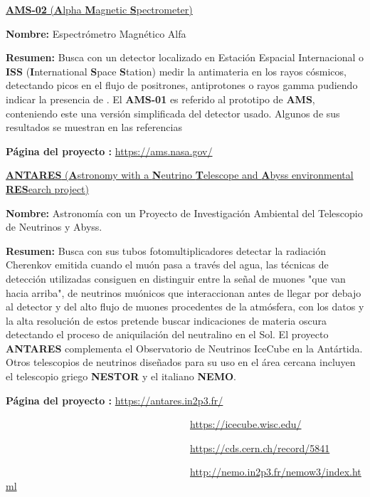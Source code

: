 \href{https://en.wikipedia.org/wiki/Alpha_Magnetic_Spectrometer}{\textbf{AMS-02} (\textbf{A}lpha \textbf{M}agnetic \textbf{S}pectrometer)}
\begin{itemize_f}\label{AMS}
\item \textbf{Nombre:} Espectrómetro Magnético Alfa
\item \textbf{Resumen:} Busca con un detector localizado en Estación Espacial Internacional o \textbf{ISS} (\textbf{I}nternational \textbf{S}pace \textbf{S}tation) medir la antimateria en los rayos cósmicos, detectando picos en el flujo de positrones, antiprotones o rayos gamma pudiendo indicar la presencia de \neutralinos. El \textbf{AMS-01} es referido al prototipo de \textbf{AMS}, conteniendo este una versión simplificada del detector usado. Algunos de sus resultados se muestran en las referencias \cite{li_antiproton_2017,battiston_anti_2008}
\item \textbf{Página del proyecto :} \href{https://ams.nasa.gov/}{https://ams.nasa.gov/}
\end{itemize_f}

\href{https://en.wikipedia.org/wiki/ANTARES_(telescope)}{\textbf{ANTARES} (\textbf{A}stronomy with a \textbf{N}eutrino \textbf{T}elescope and \textbf{A}byss environmental \textbf{RES}earch project)}
\begin{itemize_f}\label{antares}
\item \textbf{Nombre:} Astronomía con un Proyecto de Investigación Ambiental del Telescopio de Neutrinos y Abyss.
\item \textbf{Resumen:} Busca con sus tubos fotomultiplicadores detectar la radiación Cherenkov emitida cuando el muón pasa a través del agua, las técnicas de detección utilizadas consiguen en distinguir entre la señal de muones "que van hacia arriba", de neutrinos muónicos que interaccionan antes de llegar por debajo al detector y del alto flujo de muones procedentes de la atmósfera, con los datos y la alta resolución de estos pretende buscar indicaciones de materia oscura detectando el proceso de aniquilación del neutralino en el Sol. El proyecto \textbf{ANTARES} complementa el Observatorio de Neutrinos IceCube en la Antártida. Otros telescopios de neutrinos diseñados para su uso en el área cercana incluyen el telescopio griego \textbf{NESTOR} y el italiano \textbf{NEMO}. 

\item \textbf{Página del proyecto :} \href{https://antares.in2p3.fr/}{https://antares.in2p3.fr/}

~~~~~~~~~~~~~~~~~~~~~~~~~~~~~~~~~~~~~\href{https://icecube.wisc.edu/}{https://icecube.wisc.edu/}

~~~~~~~~~~~~~~~~~~~~~~~~~~~~~~~~~~~~~\href{https://cds.cern.ch/record/5841}{https://cds.cern.ch/record/5841}

~~~~~~~~~~~~~~~~~~~~~~~~~~~~~~~~~~~~~\href{http://nemo.in2p3.fr/nemow3/index.html}{http://nemo.in2p3.fr/nemow3/index.html}
\end{itemize_f}

